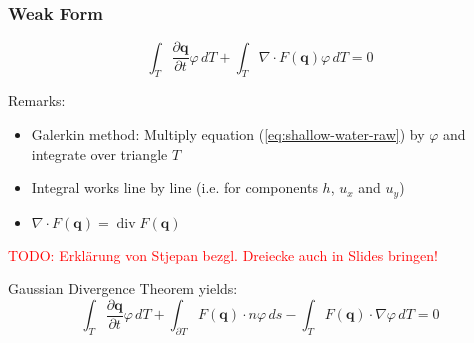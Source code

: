 \documentclass{beamer}
\newcommand{\todo}[1]{\textcolor{red}{TODO: #1}}
\newcommand{\pd}[2]{\dfrac{\partial #1}{\partial #2}}
\renewcommand{\phi}{\varphi}
\DeclareMathOperator{\divergence}{div}
\begin{document}
\begin{frame}
  \frametitle{Weak Form}
  \begin{equation}
    \label{eq:shallow-water-weak-form}
    \int_T \pd {\mathbf{q}}{t} \phi \, dT + \int_T \nabla \cdot F(\mathbf{q}) \phi \, dT = 0
  \end{equation}
  
  \begin{block}{Remarks:}
    \begin{itemize}
    \item Galerkin method: Multiply equation (\ref{eq:shallow-water-raw}) by $\phi$ and integrate over triangle $T$
    \item Integral works line by line (i.e. for components $h$, $u_x$ and $u_y$)
    \item $\nabla \cdot F(\mathbf{q}) = \divergence F(\mathbf{q})$
    \end{itemize}
  \end{block}
  \todo{Erklärung von Stjepan bezgl. Dreiecke auch in Slides bringen!}

  Gaussian Divergence Theorem yields:
  \begin{equation*}
    \int_T \pd {\mathbf{q}}{t} \phi \, dT +
    \int_{\partial T} F(\mathbf{q}) \cdot n \phi \, ds -
    \int_T F(\mathbf{q}) \cdot \nabla \phi \, dT = 0
  \end{equation*}

\end{frame}
\end{document}

